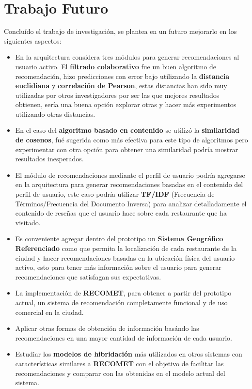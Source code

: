 \documentclass[12pt,letterpaper,oneside] {memoir}
\begin{document}
\section{Trabajo Futuro}

Concluído el trabajo de investigación, se plantea en un futuro mejorarlo en los siguientes aspectos:
\begin{itemize} 
\item En la arquitectura considera tres módulos para generar recomendaciones al usuario activo. El \textbf{filtrado colaborativo} fue un buen algoritmo de recomendación, hizo predicciones con error bajo utilizando la \textbf{distancia euclidiana} y \textbf{correlación de Pearson}, estas distancias han sido muy utilizadas por otros investigadores por ser las que mejores resultados obtienen, sería una buena opción explorar otras y hacer más experimentos utilizando otras distancias.
\item En el caso del \textbf{algoritmo basado en contenido} se utilizó la \textbf{similaridad de cosenos}, fué sugerida como más efectiva para este tipo de algoritmos pero experimentar con otra opción para obtener una similaridad podría mostrar resultados inesperados.
\item El módulo de recomendaciones mediante el perfil de usuario podría agregarse en la arquitectura para generar recomendaciones basadas en el contenido del perfil de usuario, este caso podría utilizar \textbf{TF/IDF} (Frecuencia de Términos/Frecuencia del Documento Inversa) para analizar detalladamente el contenido de reseñas que el usuario hace sobre cada  restaurante que ha visitado.
\item Es conveniente agregar dentro del prototipo un \textbf{Sistema Geográfico Referenciado} como \citep{Espinilla2009} que permita la localización de cada restaurante de la ciudad y hacer recomendaciones basadas en la ubicación física del usuario activo, esto para tener más información sobre el usuario para generar recomendaciones que satisfagan sus expectativas.
\item La implementación de \textbf{RECOMET}, para obtener a partir del prototipo actual, un sistema de recomendación completamente funcional y de uso comercial en la ciudad.
\item Aplicar otras formas de obtención de información basándo las recomendaciones en una mayor cantidad de información de cada usuario.
\item Estudiar los \textbf{modelos de hibridación} más utilizados en otros sistemas con características similares a \textbf{RECOMET} con el objetivo de facilitar las recomendaciones y comparar con las obtenidas en el modelo actual del sistema.

\end{itemize}
\end{document}
